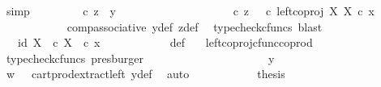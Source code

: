 \begin{isabellebody}
\ simp\isanewline
\ \ \ \ \ \ \isamarkupfalse%
\ {\isachardoublequoteopen}{\isasymrho}\ {\isasymcirc}\isactrlsub c\ z\ {\isacharequal}{\kern0pt}\ y{\isachardoublequoteclose}\isanewline
\ \ \ \ \ \ \isamarkupfalse%
\ {\isacharminus}{\kern0pt}\ \isanewline
\ \ \ \ \ \ \ \ \isamarkupfalse%
\ {\isachardoublequoteopen}{\isasymrho}\ {\isasymcirc}\isactrlsub c\ z\ {\isacharequal}{\kern0pt}\ {\isacharparenleft}{\kern0pt}{\isasymrho}\ {\isasymcirc}\isactrlsub c\ left{\isacharunderscore}{\kern0pt}coproj\ X\ X{\isacharparenright}{\kern0pt}\ {\isasymcirc}\isactrlsub c\ x{\isachardoublequoteclose}\isanewline
\ \ \ \ \ \ \ \ \ \ \isamarkupfalse%
\ comp{\isacharunderscore}{\kern0pt}associative{}\ y{\isacharunderscore}{\kern0pt}def\ z{\isacharunderscore}{\kern0pt}def\ \isamarkupfalse%
\ {\isacharparenleft}{\kern0pt}typecheck{\isacharunderscore}{\kern0pt}cfuncs{\isacharcomma}{\kern0pt}\ blast{\isacharparenright}{\kern0pt}\isanewline
\ \ \ \ \ \ \ \ \isamarkupfalse%
\ \isamarkupfalse%
\ {\isachardoublequoteopen}{\isachardot}{\kern0pt}{\isachardot}{\kern0pt}{\isachardot}{\kern0pt}\ {\isacharequal}{\kern0pt}\ {\isasymlangle}id\ X{\isacharcomma}{\kern0pt}\ {\isasymt}\ {\isasymcirc}\isactrlsub c\ {\isasymbeta}\isactrlbsub X\isactrlesub {\isasymrangle}\ \ {\isasymcirc}\isactrlsub c\ x{\isachardoublequoteclose}\isanewline
\ \ \ \ \ \ \ \ \ \ \isamarkupfalse%
\ {\isasymrho}{\isacharunderscore}{\kern0pt}def\ \ \isamarkupfalse%
\ left{\isacharunderscore}{\kern0pt}coproj{\isacharunderscore}{\kern0pt}cfunc{\isacharunderscore}{\kern0pt}coprod\ \isamarkupfalse%
\ {\isacharparenleft}{\kern0pt}typecheck{\isacharunderscore}{\kern0pt}cfuncs{\isacharcomma}{\kern0pt}\ presburger{\isacharparenright}{\kern0pt}\ \ \ \ \ \ \ \ \isanewline
\ \ \ \ \ \ \ \ \isamarkupfalse%
\ \isamarkupfalse%
\ {\isachardoublequoteopen}{\isachardot}{\kern0pt}{\isachardot}{\kern0pt}{\isachardot}{\kern0pt}\ {\isacharequal}{\kern0pt}\ y{\isachardoublequoteclose}\isanewline
\ \ \ \ \ \ \ \ \ \ \isamarkupfalse%
\ {\isacartoucheopen}w\ {\isacharequal}{\kern0pt}\ {\isasymt}{\isacartoucheclose}\ cart{\isacharunderscore}{\kern0pt}prod{\isacharunderscore}{\kern0pt}extract{\isacharunderscore}{\kern0pt}left\ y{\isacharunderscore}{\kern0pt}def\ \isamarkupfalse%
\ auto\isanewline
\ \ \ \ \ \ \ \ \isamarkupfalse%
\ \isamarkupfalse%
\ {\isacharquery}{\kern0pt}thesis\isacommand{{\isachardot}{\kern0pt}}\isamarkupfalse%

\end{isabellebody}
